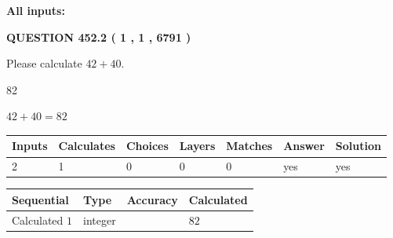 \documentclass[12pt]{article}
\begin{document}
   
   
   
\noindent{}
   
   
   
   
\noindent\vspace{0.1in}\hspace{-0.08in} {\textbf{\Large{All inputs: }}}
   
   
  
\vspace{0.2in}
  
{\textbf{\Large{QUESTION
452.2 
 ( 1 , 1 , 6791 )
}}}
  
  
 
Please calculate $ %
42 +  %
40 $.
 
 
 
\noindent{}
 
 

82
 
 
\noindent{}
 
 

 
 
 
\noindent{}
 
 

$ %
42 +  %
40=   %
82$
 
 
\noindent{}
 
 

 
   
   
   
   
\noindent\begin{tabular}{|l|l|l|l|l|l|l|}
 \hline
Inputs & Calculates & Choices & Layers & Matches & Answer & Solution \\ \hline
 2  & 
 1  & 
 0
  & 
 0  & 
 0  & 
  yes & 
  yes 
  \\ \hline
 \end{tabular}
   
   
   
   
\noindent{}
   
   
  
  
\noindent\begin{tabular}{|l|l|l|l|}
\hline
 Sequential & Type & Accuracy & Calculated \\ 
\hline
 
 
  Calculated $  1 $ & integer &  & 
  $ 82 $ 
 \\  \hline  
 \end{tabular}
   
\end{document}
